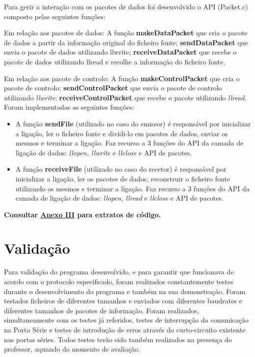 \documentclass[a4paper, 11pt]{article}
\begin{document}
Para gerir a interação com os pacotes de dados foi desenvolvido o API (Packet.c) composto pelas seguintes funções:

Em relação aos pacotes de dados: 
A função \textbf{makeDataPacket} que cria o pacote de dados a partir da informação original do ficheiro fonte; \textbf{sendDataPacket} que envia o pacote de dados utilizando llwrite; \textbf{receiveDataPacket} que recebe o pacote de dados utilizando llread e recolhe a informação do ficheiro fonte.

Em relação aos pacote de controlo:
A função \textbf{makeControlPacket} que cria o pacote de controlo; \textbf{sendControlPacket} que envia o pacote de controlo utilizando \textit{llwrite}; \textbf{receiveControlPacket} que recebe o pacote utilizando \textit{llread}.\\

Foram implementadas as seguintes funções:
\begin{itemize}
	\item A função \textbf{sendFile} (utilizado no caso do emissor) é responsável por inicializar a ligação, ler o ficheiro fonte e dividi-lo em pacotes de dados, enviar os mesmos e terminar a ligação. Faz recurso a 3 funções do API da camada de ligação de dados: \textit{llopen, llwrite} e \textit{llclose} e API de pacotes.
	\item A função \textbf{receiveFile} (utilizado no caso do recetor) é responsável por inicializar a ligação, ler os pacotes de dados, reconstruir o ficheiro fonte utilizando os mesmos e terminar a ligação. Faz recurso a 3 funções do API da camada de ligação de dados: \textit{llopen, llread} e \textit{llclose} e API de pacotes.
\end{itemize}

\textbf{Consultar \underline{Anexo III} para extratos de código.}

\section{Validação}

Para validação do programa desenvolvido, e para garantir que funcionava de acordo com o protocolo especificado, foram realizados constantemente testes durante o desenvolvimento do programa e também na sua demonstração. Foram testados ficheiros de diferentes tamanhos e enviados com diferentes baudrates e diferentes tamanhos de pacotes de informação. Foram realizados, simultaneamente com os testes já referidos, testes de interrupção da comunicação na Porta Série e testes de introdução de erros através do curto-circuito existente nas portas séries. Todos testes terão sido também realizados na presença do professor, aquando do momento de avaliação.
\end{document}
